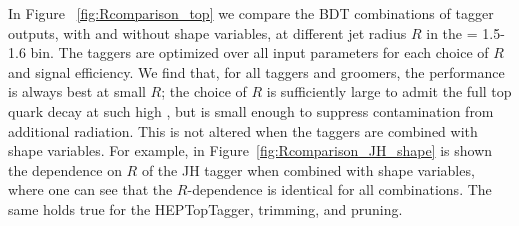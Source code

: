 In Figure ~\ref{fig:Rcomparison_top} we compare the BDT combinations of tagger outputs, with and without shape variables, at different jet radius $R$ in the \pt = 1.5-1.6 \TeV bin. The taggers are optimized over all input parameters for each choice of $R$ and signal efficiency. We find that, for all taggers and groomers, the performance is always best at small $R$; the choice of $R$ is sufficiently large to admit the full top quark decay at such high \pt, but is small enough to suppress contamination from additional radiation. This is not altered when the taggers are combined with shape variables. For example, in Figure~\ref{fig:Rcomparison_JH_shape} is shown the dependence on $R$ of the JH tagger when combined with shape variables, where one can see that the $R$-dependence is identical for all combinations. The same holds true for the HEPTopTagger, trimming, and pruning.

